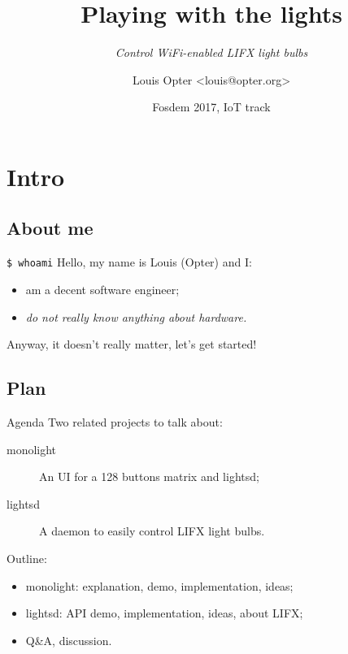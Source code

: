 \documentclass{lgtdslides}
\title{Playing with the lights}
\subtitle{\textit{Control WiFi-enabled LIFX light bulbs}}
\date{Fosdem 2017, IoT track}
\author{Louis Opter <louis@opter.org>}
\begin{document}
\begin{frame}\titlepage\end{frame}

\section{Intro}

\subsection{About me}

\begin{frame}{\LARGE{\texttt{\$ whoami}}}
Hello, my name is Louis (Opter) and I:\vspace{1em}
\begin{itemize}
\item am a decent software engineer;
\item \emph{do not really know anything about hardware.}
\end{itemize}
\vspace{1em}
Anyway, it doesn't really matter, let's get started!
\end{frame}

\subsection{Plan}

\begin{frame}{Agenda}
Two related projects to talk about:
\vspace{1em}
\begin{description}
\item[monolight] An UI for a 128 buttons matrix and lightsd;
\item[lightsd] A daemon to easily control LIFX light bulbs.
\end{description}
\pause
\vspace{2em}
Outline:
\vspace{1em}
\begin{itemize}
\item monolight: explanation, demo, implementation, ideas;
\item lightsd: API demo, implementation, ideas, about LIFX;
\item Q\&A, discussion.
\end{itemize}
\end{frame}
\end{document}
